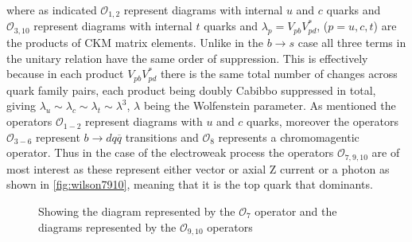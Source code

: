 where as indicated $\mathcal{O}_{1,2}$ represent diagrams with internal $u$ and $c$ quarks and $\mathcal{O}_{3,10}$ represent diagrams with internal $t$ quarks and $\lambda_{p} = V_{pb}V^{*}_{pd}$, ($p = u,c,t$) are the products of CKM matrix elements. Unlike in the $b\to s$ case all three terms in the unitary relation have the same order of suppression. This is effectively because in each product $V_{pb}V^{*}_{pd}$ there is the same total number of changes across quark family pairs, each product being doubly Cabibbo suppressed in total, giving $\lambda_{u} \sim \lambda_{c} \sim \lambda_{t} \sim \lambda^{3}$, $\lambda$ being the Wolfenstein parameter. As mentioned the operators $\mathcal{O}_{1-2}$ represent diagrams with $u$ and $c$ quarks, moreover the operators $\mathcal{O}_{3-6}$ represent $b\to dq\overline{q}$ transitions and $\mathcal{O}_{8}$ represents a chromomagentic operator. Thus in the case of the electroweak process the operators $\mathcal{O}_{7,9,10}$ are of most interest as these represent either vector or axial Z current or a photon as shown in \autoref{fig:wilson7910}, meaning that it is the top quark that dominants.
\begin{figure}[ht!]
    \centering
  \hspace*{-2cm}
           \caption{Showing \protect{} the diagram represented by the $\mathcal{O}_{7}$ operator and\protect{} the diagrams represented by the $\mathcal{O}_{9,10}$ operators~\cite{lowrecoil}}
           \label{fig:wilson7910}
\end{figure}


